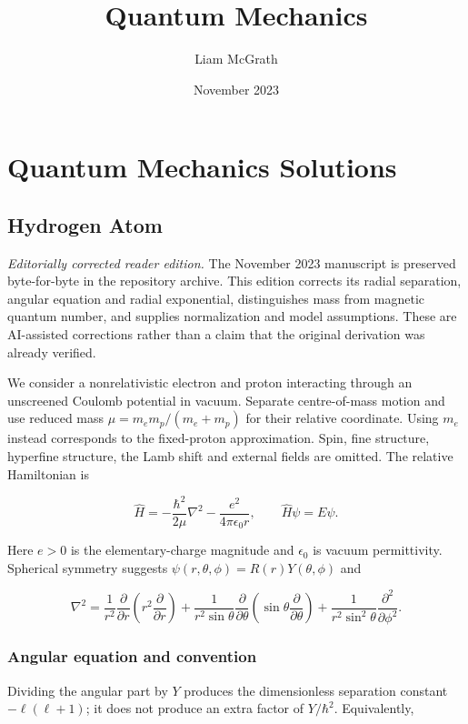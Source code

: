 \documentclass{article}
\title{Quantum Mechanics}
\author{Liam McGrath}
\date{November 2023}
\begin{document}
\maketitle

\section{Quantum Mechanics Solutions}

\subsection{Hydrogen Atom}

\textit{Editorially corrected reader edition.} The November 2023 manuscript is preserved byte-for-byte in the repository archive. This edition corrects its radial separation, angular equation and radial exponential, distinguishes mass from magnetic quantum number, and supplies normalization and model assumptions. These are AI-assisted corrections rather than a claim that the original derivation was already verified.

We consider a nonrelativistic electron and proton interacting through an unscreened Coulomb potential in vacuum. Separate centre-of-mass motion and use reduced mass $\mu=m_e m_p/(m_e+m_p)$ for their relative coordinate. Using $m_e$ instead corresponds to the fixed-proton approximation. Spin, fine structure, hyperfine structure, the Lamb shift and external fields are omitted. The relative Hamiltonian is

\begin{equation}
\hat H = -\frac{\hbar^2}{2\mu}\nabla^2 - \frac{e^2}{4\pi\epsilon_0r},\qquad \hat H\psi=E\psi.
\label{hydrogen-hamiltonian}
\end{equation}

Here $e>0$ is the elementary-charge magnitude and $\epsilon_0$ is vacuum permittivity. Spherical symmetry suggests $\psi(r,\theta,\phi)=R(r)Y(\theta,\phi)$ and

\begin{equation}
\nabla^2=\frac{1}{r^2}\frac{\partial}{\partial r}\left(r^2\frac{\partial}{\partial r}\right)
+\frac{1}{r^2\sin\theta}\frac{\partial}{\partial\theta}\left(\sin\theta\frac{\partial}{\partial\theta}\right)
+\frac{1}{r^2\sin^2\theta}\frac{\partial^2}{\partial\phi^2}.
\end{equation}

\subsubsection{Angular equation and convention}
Dividing the angular part by $Y$ produces the dimensionless separation constant $-\ell(\ell+1)$; it does not produce an extra factor of $Y/\hbar^2$. Equivalently,
\end{document}
